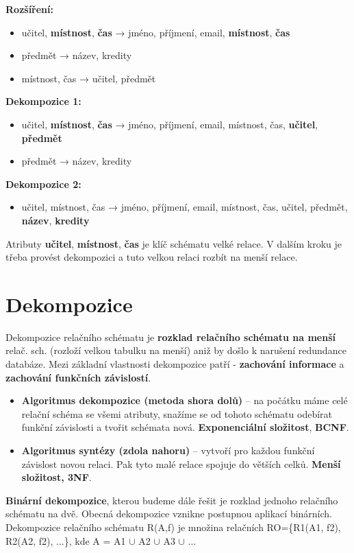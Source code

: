 \noindent\textbf{Rozšíření:}
\begin{itemize}
    \item učitel, \textbf{místnost}, \textbf{čas} → jméno, příjmení, email, \textbf{místnost}, \textbf{čas}
    \item předmět → název, kredity
    \item místnost, čas → učitel, předmět
\end{itemize}

\noindent\textbf{Dekompozice 1:}
\begin{itemize}
    \item učitel, \textbf{místnost}, \textbf{čas} → jméno, příjmení, email, místnost, čas, \textbf{učitel}, \textbf{předmět}
    \item předmět → název, kredity
\end{itemize}

\noindent\textbf{Dekompozice 2:}
\begin{itemize}
    \item učitel, místnost, čas → jméno, příjmení, email, místnost, čas, učitel, předmět, \textbf{název}, \textbf{kredity}
\end{itemize}

Atributy \textbf{učitel}, \textbf{místnost}, \textbf{čas} je klíč schématu velké relace. V dalším kroku je třeba provést dekompozici a tuto velkou relaci rozbít na menší relace.

\section{Dekompozice}
Dekompozice relačního schématu je \textbf{rozklad relačního schématu na menší} relač. sch. (rozloží velkou tabulku na menší) aniž by došlo k narušení redundance databáze. Mezi základní vlastnosti dekompozice patří - \textbf{zachování informace} a \textbf{zachování funkčních závislostí}.
\begin{itemize}
    \item \textbf{Algoritmus dekompozice (metoda shora dolů)} -- na počátku máme celé relační schéma se všemi atributy, snažíme se od tohoto schématu odebírat funkční závislosti a tvořit schémata nová. \textbf{Exponenciální složitost}, \textbf{BCNF}.
    \item \textbf{Algoritmus syntézy (zdola nahoru)} -- vytvoří pro každou funkční závislost novou relaci. Pak tyto malé relace spojuje do větších celků. \textbf{Menší složitost, 3NF}.
\end{itemize}
\textbf{Binární dekompozice}, kterou budeme dále řešit je rozklad jednoho relačního schématu na dvě. Obecná dekompozice vznikne postupnou aplikací binárních. Dekompozice relačního schématu R(A,f) je množina relačních RO=\{R1(A1, f2), R2(A2, f2), ...\}, kde A = A1 $\cup$ A2 $\cup$ A3 $\cup$ ...

